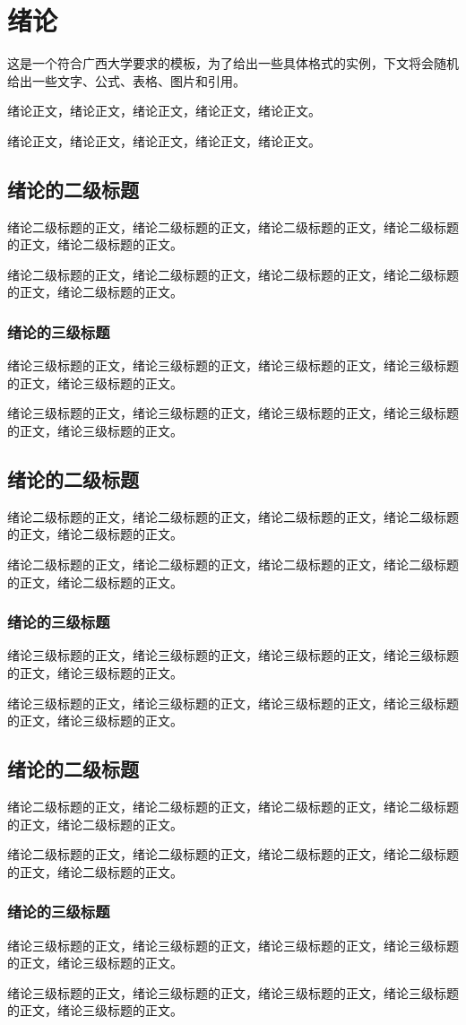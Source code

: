 \section{绪论\label{绪论}}

这是一个符合广西大学要求的模板，为了给出一些具体格式的实例，下文将会随机给出一些文字、公式、表格、图片和引用\cite{Dirac1931}。

绪论正文，绪论正文，绪论正文，绪论正文，绪论正文。

绪论正文，绪论正文，绪论正文，绪论正文，绪论正文。

\subsection{绪论的二级标题}

绪论二级标题的正文，绪论二级标题的正文，绪论二级标题的正文，绪论二级标题的正文，绪论二级标题的正文。

绪论二级标题的正文，绪论二级标题的正文，绪论二级标题的正文，绪论二级标题的正文，绪论二级标题的正文。

\subsubsection{绪论的三级标题}

绪论三级标题的正文，绪论三级标题的正文，绪论三级标题的正文，绪论三级标题的正文，绪论三级标题的正文。

绪论三级标题的正文，绪论三级标题的正文，绪论三级标题的正文，绪论三级标题的正文，绪论三级标题的正文。


\subsection{绪论的二级标题}

绪论二级标题的正文，绪论二级标题的正文，绪论二级标题的正文，绪论二级标题的正文，绪论二级标题的正文。

绪论二级标题的正文，绪论二级标题的正文，绪论二级标题的正文，绪论二级标题的正文，绪论二级标题的正文。

\subsubsection{绪论的三级标题}

绪论三级标题的正文，绪论三级标题的正文，绪论三级标题的正文，绪论三级标题的正文，绪论三级标题的正文。

绪论三级标题的正文，绪论三级标题的正文，绪论三级标题的正文，绪论三级标题的正文，绪论三级标题的正文。


\subsection{绪论的二级标题}

绪论二级标题的正文，绪论二级标题的正文，绪论二级标题的正文，绪论二级标题的正文，绪论二级标题的正文。

绪论二级标题的正文，绪论二级标题的正文，绪论二级标题的正文，绪论二级标题的正文，绪论二级标题的正文。

\subsubsection{绪论的三级标题}

绪论三级标题的正文，绪论三级标题的正文，绪论三级标题的正文，绪论三级标题的正文，绪论三级标题的正文。

绪论三级标题的正文，绪论三级标题的正文，绪论三级标题的正文，绪论三级标题的正文，绪论三级标题的正文。